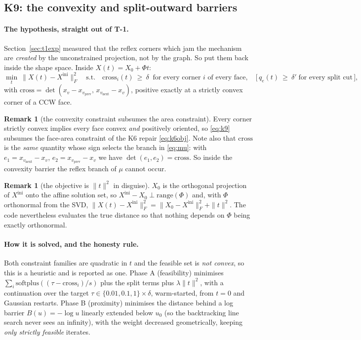 \documentclass[11pt,a4paper]{article}
\theoremstyle{definition}
\newtheorem{remark}[theorem]{Remark}
\begin{document}
\subsection{K9: the convexity and split-outward barriers}

\paragraph{The hypothesis, straight out of T-1.} Section~\ref{sec:t1exp} measured that the
reflex corners which jam the mechanism are \emph{created} by the unconstrained projection,
not by the graph. So put them back inside the shape space. Inside $X(t)=X_0+\Phi t$:
\begin{equation}
\min_t\ \|X(t)-X^{\mathrm{ini}}\|_F^2
\quad\text{s.t.}\quad
\mathrm{cross}_i(t)\ \ge\ \delta \;\;\text{for every corner }i\text{ of every face},
\quad\bigl[\,q_e(t)\ \ge\ \delta'\;\text{for every split cut}\,\bigr],
\label{eq:k9}
\end{equation}
with $\mathrm{cross} = \det(x_v-x_{v_{\mathrm{prev}}},\,x_{v_{\mathrm{next}}}-x_v)$, positive
exactly at a strictly convex corner of a CCW face.

\begin{remark}[the convexity constraint subsumes the area constraint]
Every corner strictly convex implies every face convex \emph{and} positively oriented, so
\eqref{eq:k9} subsumes the face-area constraint of the K6 repair \eqref{eq:k6obj}. Note also
that $\mathrm{cross}$ is the \emph{same} quantity whose sign selects the branch in
\eqref{eq:mu}: with $e_1=x_{v_{\mathrm{next}}}-x_v$, $e_2=x_{v_{\mathrm{prev}}}-x_v$ we have
$\det(e_1,e_2)=\mathrm{cross}$. So inside the convexity barrier the reflex branch of $\mu$
cannot occur.
\end{remark}

\begin{remark}[the objective is $\|t\|^2$ in disguise]
$X_0$ is the orthogonal projection of $X^{\mathrm{ini}}$ onto the affine solution set, so
$X^{\mathrm{ini}}-X_0\perp\mathrm{range}(\Phi)$ and, with $\Phi$ orthonormal from the SVD,
$\|X(t)-X^{\mathrm{ini}}\|_F^2 = \|X_0-X^{\mathrm{ini}}\|_F^2 + \|t\|^2$. The code
nevertheless evaluates the true distance so that nothing depends on $\Phi$ being exactly
orthonormal.
\end{remark}

\paragraph{How it is solved, and the honesty rule.} Both constraint families are quadratic in
$t$ and the feasible set is \emph{not convex}, so this is a heuristic and is reported as one.
Phase A (feasibility) minimises $\sum_i\mathrm{softplus}((\tau-\mathrm{cross}_i)/s)$ plus the
split terms plus $\lambda\|t\|^2$, with a continuation over the target
$\tau\in\{0.01,0.1,1\}\times\delta$, warm-started, from $t=0$ and Gaussian restarts. Phase B
(proximity) minimises the distance behind a log barrier $B(u)=-\log u$ linearly extended below
$u_0$ (so the backtracking line search never sees an infinity), with the weight decreased
geometrically, keeping \emph{only strictly feasible} iterates.
\end{document}
